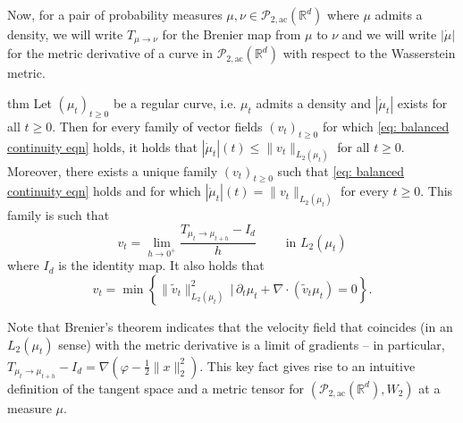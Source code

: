 \documentclass{article}
\begin{document}
Now, for a pair of probability measures $\mu, \nu \in \mathcal{P}_{2, \text{ac}}(\mathbb{R}^d)$ where $\mu$ admits a density, we will write $T_{\mu \rightarrow \nu}$ for the Brenier map from $\mu$ to $\nu$ and we will write $|\dot \mu|$ for the metric derivative of a curve in $\mathcal{P}_{2, \text{ac}}(\mathbb{R}^d)$ with respect to the Wasserstein metric.

\begin{restatable}{thm}{}
    Let $(\mu_t)_{t\geq 0}$ be a regular curve, i.e. $\mu_t$ admits a density and $|\dot \mu_t|$ exists for all $t \geq 0$. Then for every family of vector fields $(v_t)_{t\geq 0}$ for which \cref{eq: balanced continuity eqn} holds, it holds that $|\dot \mu_t|(t) \leq \|v_t\|_{L_2(\mu_t)}$ for all $t \geq 0$. Moreover, there exists a unique family $(v_t)_{t\geq 0}$ such that \cref{eq: balanced continuity eqn} holds and for which $|\dot \mu_t|(t) = \|v_t\|_{L_2(\mu_t)}$ for every $t \geq 0$. This family is such that
    \begin{equation*}
        v_t = \lim_{h \rightarrow0^+}\frac{T_{\mu_t\rightarrow \mu_{t+h}}- I_d}{h} \qquad \text{ in $L_2(\mu_t)$}
    \end{equation*}
    where $I_d$ is the identity map. It also holds that 
    \begin{equation*}
        v_t = \min \left\{\|\tilde{v}_t\|_{L_2(\mu_t)}^2 \, \Big|\, \partial_t\mu_t + \nabla \cdot (\tilde v_t\mu_t) = 0\right\}.
    \end{equation*}
\end{restatable}

Note that Brenier's theorem indicates that the velocity field that coincides (in an $L_2(\mu_t)$ sense) with the metric derivative is a limit of gradients -- in particular, $T_{\mu_t \rightarrow \mu_{t+h}} - I_d = \nabla (\varphi - \frac{1}{2}\|x\|_2^2)$. This key fact gives rise to an intuitive definition of the tangent space and a metric tensor for $(\mathcal{P}_{2, \text{ac}}(\mathbb{R}^d), W_2)$ at a measure $\mu$. 
\end{document}
